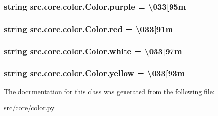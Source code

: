 \subsubsection[{purple}]{\setlength{\rightskip}{0pt plus 5cm}string src.\+core.\+color.\+Color.\+purple = \textquotesingle{}\textbackslash{}033\mbox{[}95m\textquotesingle{}\hspace{0.3cm}{\ttfamily [static]}}\label{classsrc_1_1core_1_1color_1_1Color_a7a5ac5a1852e67a22b6bdd2cf9640a74}
\hypertarget{classsrc_1_1core_1_1color_1_1Color_a1031a20cc2bdf64cc3d28b2546cfcc4e}{}
\subsubsection[{red}]{\setlength{\rightskip}{0pt plus 5cm}string src.\+core.\+color.\+Color.\+red = \textquotesingle{}\textbackslash{}033\mbox{[}91m\textquotesingle{}\hspace{0.3cm}{\ttfamily [static]}}\label{classsrc_1_1core_1_1color_1_1Color_a1031a20cc2bdf64cc3d28b2546cfcc4e}
\hypertarget{classsrc_1_1core_1_1color_1_1Color_a6b2f32d8cb5ac52330ea7633c4e8d7de}{}
\subsubsection[{white}]{\setlength{\rightskip}{0pt plus 5cm}string src.\+core.\+color.\+Color.\+white = \textquotesingle{}\textbackslash{}033\mbox{[}97m\textquotesingle{}\hspace{0.3cm}{\ttfamily [static]}}\label{classsrc_1_1core_1_1color_1_1Color_a6b2f32d8cb5ac52330ea7633c4e8d7de}
\hypertarget{classsrc_1_1core_1_1color_1_1Color_ae679f19112a1c3c6c91b5e7b8bbe2571}{}
\subsubsection[{yellow}]{\setlength{\rightskip}{0pt plus 5cm}string src.\+core.\+color.\+Color.\+yellow = \textquotesingle{}\textbackslash{}033\mbox{[}93m\textquotesingle{}\hspace{0.3cm}{\ttfamily [static]}}\label{classsrc_1_1core_1_1color_1_1Color_ae679f19112a1c3c6c91b5e7b8bbe2571}


The documentation for this class was generated from the following file\+:\begin{DoxyCompactItemize}
\item 
src/core/\hyperlink{color_8py}{color.\+py}\end{DoxyCompactItemize}
